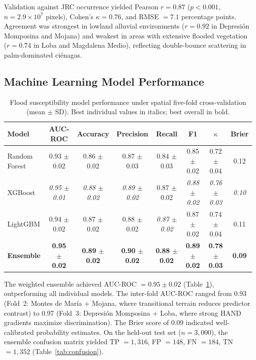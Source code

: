 \documentclass{article}
\begin{document}
Validation against JRC occurrence yielded Pearson $r = 0.87$ ($p < 0.001$, $n = 2.9 \times 10^7$ pixels), Cohen's $\kappa = 0.76$, and RMSE $= 7.1$ percentage points. Agreement was strongest in lowland alluvial environments ($r = 0.92$ in Depresi\'on Momposina and Mojana) and weakest in areas with extensive flooded vegetation ($r = 0.74$ in Loba and Magdalena Medio), reflecting double-bounce scattering in palm-dominated ci\'enagas.

\subsection{Machine Learning Model Performance}

\begin{table}[htbp]
\caption{Flood susceptibility model performance under spatial five-fold cross-validation (mean $\pm$ SD). Best individual values in italics; best overall in bold.}
\label{tab:ml_results}
\centering
\footnotesize
\begin{tabular}{lccccccc}
\toprule
\textbf{Model} & \textbf{AUC-ROC} & \textbf{Accuracy} & \textbf{Precision} & \textbf{Recall} & \textbf{F1} & \textbf{$\kappa$} & \textbf{Brier} \\
\midrule
Random Forest   & 0.93 $\pm$ 0.02 & 0.86 $\pm$ 0.02 & 0.87 $\pm$ 0.03 & 0.84 $\pm$ 0.03 & 0.85 $\pm$ 0.02 & 0.72 $\pm$ 0.04 & 0.12 \\
XGBoost         & \textit{0.95 $\pm$ 0.01} & \textit{0.88 $\pm$ 0.02} & \textit{0.89 $\pm$ 0.02} & 0.87 $\pm$ 0.02 & \textit{0.88 $\pm$ 0.02} & \textit{0.76 $\pm$ 0.03} & \textit{0.10} \\
LightGBM        & 0.94 $\pm$ 0.02 & 0.87 $\pm$ 0.02 & 0.88 $\pm$ 0.02 & \textit{0.87 $\pm$ 0.02} & 0.87 $\pm$ 0.02 & 0.74 $\pm$ 0.04 & 0.11 \\
\textbf{Ensemble} & \textbf{0.95 $\pm$ 0.02} & \textbf{0.89 $\pm$ 0.02} & \textbf{0.90 $\pm$ 0.02} & \textbf{0.88 $\pm$ 0.02} & \textbf{0.89 $\pm$ 0.02} & \textbf{0.78 $\pm$ 0.03} & \textbf{0.09} \\
\bottomrule
\end{tabular}
\end{table}

The weighted ensemble achieved AUC-ROC $= 0.95 \pm 0.02$ (Table~\ref{tab:ml_results}), outperforming all individual models. The inter-fold AUC-ROC ranged from 0.93 (Fold~2: Montes de Mar\'ia + Mojana, where transitional terrain reduces predictor contrast) to 0.97 (Fold~3: Depresi\'on Momposina + Loba, where strong HAND gradients maximize discrimination). The Brier score of 0.09 indicated well-calibrated probability estimates. On the held-out test set ($n = 3{,}000$), the ensemble confusion matrix yielded TP $= 1{,}316$, FP $= 148$, FN $= 184$, TN $= 1{,}352$ (Table~\ref{tab:confusion}).
\end{document}
